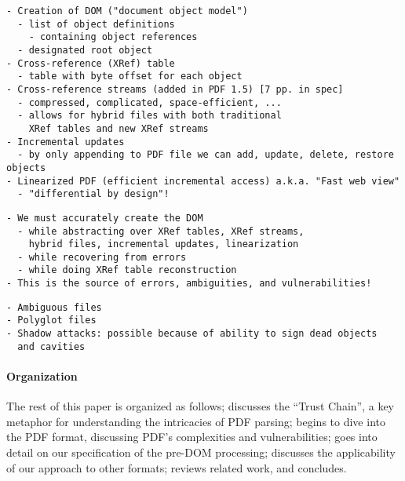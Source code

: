 \begin{lstlisting}[style=meta]
- Creation of DOM ("document object model")
  - list of object definitions
    - containing object references
  - designated root object
- Cross-reference (XRef) table
  - table with byte offset for each object
- Cross-reference streams (added in PDF 1.5) [7 pp. in spec]
  - compressed, complicated, space-efficient, ...
  - allows for hybrid files with both traditional
    XRef tables and new XRef streams
- Incremental updates
  - by only appending to PDF file we can add, update, delete, restore objects
- Linearized PDF (efficient incremental access) a.k.a. "Fast web view"
  - "differential by design"!
\end{lstlisting}
\begin{lstlisting}[style=meta]
- We must accurately create the DOM 
  - while abstracting over XRef tables, XRef streams,
    hybrid files, incremental updates, linearization
  - while recovering from errors
  - while doing XRef table reconstruction
- This is the source of errors, ambiguities, and vulnerabilities!
\end{lstlisting}

\label{sec:pdf-vulnerabilities}
\begin{lstlisting}[style=meta]
- Ambiguous files
- Polyglot files
- Shadow attacks: possible because of ability to sign dead objects
  and cavities 
\end{lstlisting}

\paragraph*{Organization} The rest of this paper is organized as
follows;
%
 discusses the ``Trust Chain'', a key metaphor
for understanding the intricacies of PDF parsing;
 begins to dive into the PDF format, discussing PDF's
complexities and vulnerabilities;
 goes into detail on our specification of the pre-DOM processing;
 discusses the applicability of our approach to other formats;
%
 reviews related work, and %
 concludes.

